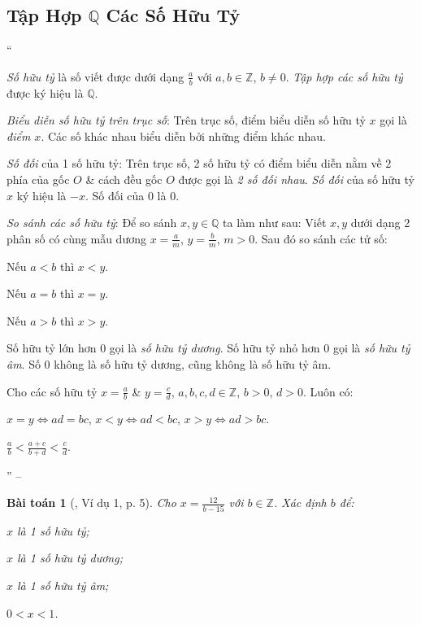 \documentclass{article}
\numberwithin{equation}{section}
\newtheorem{baitoan}{Bài toán}[section]
\begin{document}
\subsection{Tập Hợp $\mathbb{Q}$ Các Số Hữu Tỷ}
``\begin{enumerate*}
	\item[\textbf{1.}] \textit{Số hữu tỷ} là số viết được dưới dạng $\frac{a}{b}$ với $a,b\in\mathbb{Z}$, $b\ne 0$. \textit{Tập hợp các số hữu tỷ} được ký hiệu là $\mathbb{Q}$.
	\item[\textbf{2.}] \textit{Biểu diễn số hữu tỷ trên trục số}: Trên trục số, điểm biểu diễn số hữu tỷ $x$ gọi là \textit{điểm $x$}. Các số khác nhau biểu diễn bởi những điểm khác nhau.
	\item[\textbf{3.}] \textit{Số đối} của 1 số hữu tỷ: Trên trục số, 2 số hữu tỷ có điểm biểu diễn nằm về 2 phía của gốc $O$ \& cách đều gốc $O$ được gọi là \textit{2 số đối nhau}. \textit{Số đối} của số hữu tỷ $x$ ký hiệu là $-x$. Số đối của $0$ là $0$.
	\item[\textbf{4.}] \textit{So sánh các số hữu tỷ}: Để so sánh $x,y\in\mathbb{Q}$ ta làm như sau: Viết $x,y$ dưới dạng 2 phân số có cùng mẫu dương $x = \frac{a}{m}$, $y = \frac{b}{m}$, $m > 0$. Sau đó so sánh các tử số:
	\begin{enumerate*}
		\item[$\bullet$] Nếu $a < b$ thì $x < y$.
		\item[$\bullet$] Nếu $a = b$ thì $x = y$.
		\item[$\bullet$] Nếu $a > b$ thì $x > y$.
	\end{enumerate*}
	Số hữu tỷ lớn hơn $0$ gọi là \textit{số hữu tỷ dương}. Số hữu tỷ nhỏ hơn $0$ gọi là \textit{số hữu tỷ âm}. Số $0$ không là số hữu tỷ dương, cũng không là số hữu tỷ âm.
	\item[\textbf{5.}] Cho các số hữu tỷ $x = \frac{a}{b}$ \& $y = \frac{c}{d}$, $a,b,c,d\in\mathbb{Z}$, $b > 0$, $d > 0$. Luôn có:
	\begin{enumerate*}
		\item[$\bullet$] $x = y\Leftrightarrow ad = bc$, $x < y\Leftrightarrow ad < bc$, $x > y\Leftrightarrow ad > bc$.
		\item[$\bullet$] $\frac{a}{b} < \frac{a + c}{b + d} < \frac{c}{d}$.
	\end{enumerate*}'' -- \cite[\S1, pp. 4--5]{Tuyen_Toan_7}
\end{enumerate*}

\begin{baitoan}[\cite{Tuyen_Toan_7}, Ví dụ 1, p. 5]
	Cho $x = \frac{12}{b - 15}$ với $b\in\mathbb{Z}$. Xác định $b$ để:
	\begin{enumerate*}
		\item[(a)] $x$ là 1 số hữu tỷ;
		\item[(b)] $x$ là 1 số hữu tỷ dương;
		\item[(c)] $x$ là 1 số hữu tỷ âm;
		\item[(d)] $0 < x < 1$.
	\end{enumerate*}
\end{baitoan}
\end{document}
